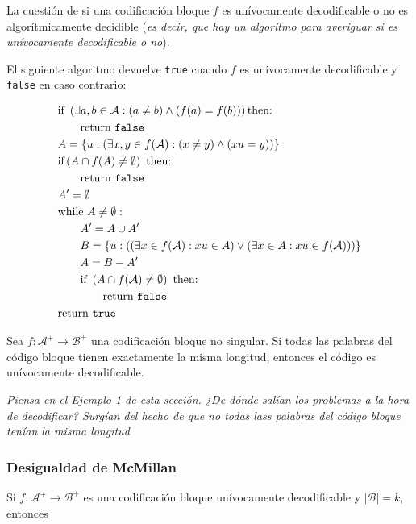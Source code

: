 La cuestión de si una codificación bloque \(f\) es unívocamente
decodificable o no es algorítmicamente decidible (\emph{es decir, que
hay un algoritmo para averiguar si es unívocamente decodificable o no}).

El siguiente algoritmo devuelve \texttt{true} cuando \(f\) es
unívocamente decodificable y \texttt{false} en caso contrario:


\begin{align*}
&\text{if }\left(\exists a,b\in\mathcal{A}: (a\neq b)\wedge(f(a)=f(b))\right)\text{then:}\\
&\quad\quad\text{return \texttt{false}}\\
&A=\left\{u: \left(\exists x,y\in f(\mathcal{A}):(x\neq y)\wedge (xu=y)\right)\right\}\\
&\text{if}\left(A\cap f(A)\neq\emptyset\right)\text{ then:}\\
&\quad\quad\text{return \texttt{false}}\\
&A'=\emptyset\\
&\text{while }A\neq\emptyset:\\
&\quad\quad A'=A\cup A'\\
&\quad\quad B = \left\{u:\left(\left(\exists x\in f(\mathcal{A}): xu\in A\right)\vee\left(\exists x\in A: xu\in f(\mathcal{A})\right)\right)\right\}\\
&\quad\quad A = B - A'\\
&\quad\quad\text{if }\left(A\cap f(\mathcal{A})\neq\emptyset\right)\text{ then:}\\
&\quad\quad\quad\quad\text{return \texttt{false}}\\
&\text{return \texttt{true}}\\
\end{align*}


Sea \(f:\mathcal{A}^+\rightarrow\mathcal{B}^+\) una codificación bloque
no singular. Si todas las palabras del código bloque tienen exactamente
la misma longitud, entonces el código es unívocamente decodificable.

\emph{Piensa en el Ejemplo 1 de esta sección. ¿De dónde salían los
problemas a la hora de decodificar? Surgían del hecho de que no todas
lass palabras del código bloque tenían la misma longitud}

\subsubsection{Desigualdad de McMillan}\label{desigualdad-de-mcmillan}

Si \(f:\mathcal{A}^+\rightarrow\mathcal{B}^+\) es una codificación
bloque unívocamente decodificable y \(\left|\mathcal{B}\right|=k\),
entonces

